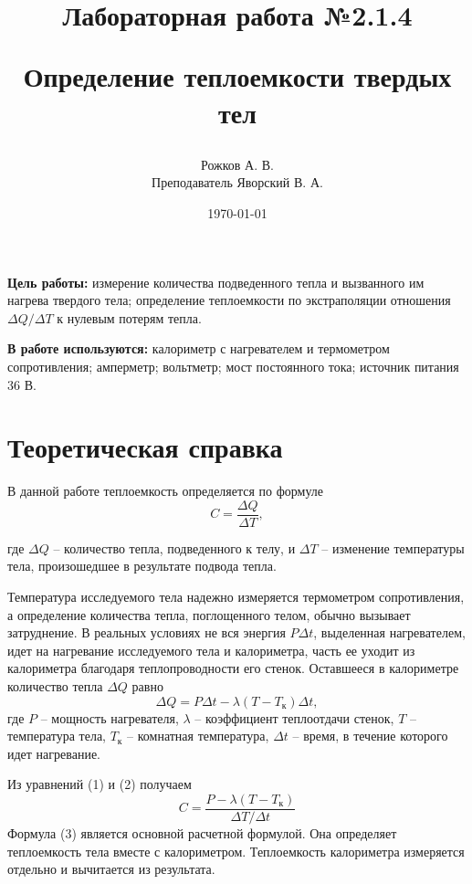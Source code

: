 \documentclass[a4paper, 12pt]{article}
\title{\begin{center}Лабораторная работа №2.1.4\end{center}
Определение теплоемкости твердых тел}
\author{Рожков А. В. \\ Преподаватель Яворский В. А.}
\date{\today}
\begin{document}
    \maketitle
    \newpage

    \textbf{Цель работы:} измерение количества подведенного тепла и вызванного им нагрева твердого тела; определение теплоемкости по экстраполяции отношения $\Delta Q / \Delta T$ к нулевым потерям тепла.

	\textbf{В работе используются:} калориметр с нагревателем и термометром сопротивления; амперметр; вольтметр; мост постоянного тока; источник питания 36 В.

    \section{Теоретическая справка}

    В данной работе теплоемкость определяется по формуле
    \begin{equation}
        C = \frac{\Delta Q}{\Delta T},
        \label{eq:dQdT}
    \end{equation}

    где $\Delta Q$ -- количество тепла, подведенного к телу, и $\Delta T$ -- изменение температуры тела, произошедшее в результате подвода тепла.

    Температура исследуемого тела надежно измеряется термометром сопротивления, а определение количества тепла, поглощенного телом, обычно вызывает затруднение. В реальных условиях не вся энергия $P \Delta t$, выделенная нагревателем, идет на нагревание исследуемого тела и калориметра, часть ее уходит из калориметра благодаря теплопроводности его стенок. Оставшееся в калориметре количество тепла $\Delta Q$ равно
    \begin{equation}
        \Delta Q = P\Delta t - \lambda(T - T_{\text{к}}) \Delta t,
        \label{eq:dQ}
    \end{equation}
    где $P$ -- мощность нагревателя, $\lambda$ -- коэффициент теплоотдачи стенок, $T$ -- температура тела, $T_{\text{к}}$ -- комнатная температура, $ \Delta t$ -- время, в течение которого идет нагревание.

    Из уравнений (1) и (2) получаем
    \begin{equation}
        C = \frac{P - \lambda(T - T_{\text{к}})}{\Delta T / \Delta t}
        \label{osnovnaya}
    \end{equation}
    Формула (3) является основной расчетной формулой. Она определяет теплоемкость тела вместе с калориметром. Теплоемкость калориметра измеряется отдельно и вычитается из результата.
\end{document}
